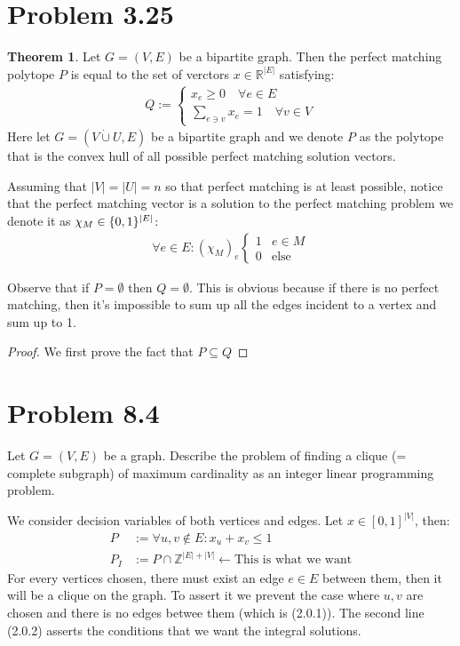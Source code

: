 \documentclass[]{article}
\theoremstyle{definition}
\newtheorem{theorem}{Theorem}       %
\begin{document}
\section{Problem 3.25}
    \begin{theorem}
        Let $G =(V, E)$ be a bipartite graph. Then the perfect matching polytope $P$ is equal to the set of verctors $x\in \mathbb R^{|E|}$ satisfying: 
        \begin{align}
            Q:= 
            \begin{cases}
                x_e \ge 0 \quad \forall e \in E
                \\
                \sum_{e\ni v}^{}x_e = 1\quad \forall v \in V    
            \end{cases}
        \end{align}
        Here let $G = (V\dot\cup U, E)$ be a bipartite graph and we denote $P$ as the polytope that is the convex hull of all possible perfect matching solution vectors. 
        \par
        Assuming that $|V| = |U| = n$ so that perfect matching is at least possible, notice that the perfect matching vector is a solution to the perfect matching problem we denote it as $\chi_M\in \mathbb \{0, 1\}^{|E|}$: 
        \begin{align}
            \forall e\in E: (\chi_M)_e 
            \begin{cases}
                1 & e \in M
                \\
                0 & \text{else}
            \end{cases}
        \end{align}

    \end{theorem}
    Observe that if $P = \emptyset$ then $Q = \emptyset$. This is obvious because if there is no perfect matching, then it's impossible to sum up all the edges incident to a vertex and sum up to 1. 
    \par
    \begin{proof}
        We first prove the fact that $P\subseteq Q$
    \end{proof}
\section{Problem 8.4}
    Let $G = (V, E)$ be a graph. Describe the problem of finding a clique (= complete subgraph) of maximum cardinality as an integer linear programming problem. 
    \par
    We consider decision variables of both vertices and edges. Let $x\in [0, 1]^{|V|}$, then: 
    \begin{align}
        P & := \forall {u, v}\not \in E: 
                x_u + x_v \le 1
        \\
        P_I &:= P \cap \mathbb Z^{|E| + |V|} \leftarrow \text{This is what we want}
    \end{align}
    For every vertices chosen, there must exist an edge $e\in E$ between them, then it will be a clique on the graph. To assert it we prevent the case where $u, v$ are chosen and there is no edges betwee them (which is (2.0.1)). The second line (2.0.2) asserts the conditions that we want the integral solutions. 
\end{document}
